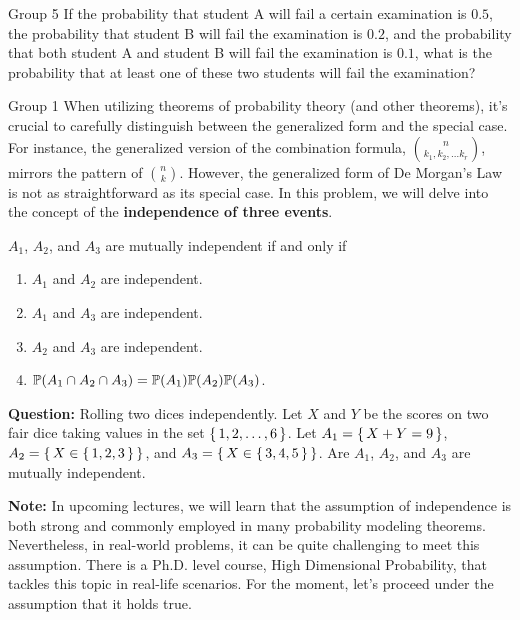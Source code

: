 \documentclass{article}
\begin{document}
\begin{problem}
    {Group 5}
    If the probability that student A will fail a certain examination is $0.5$, the probability that student B will fail the examination is $0.2$, and the probability that both student A and student B will fail the examination is $0.1$, what is the probability that at least one of these two students will fail the examination?
\end{problem}
\begin{problem}
    {Group 1}
    When utilizing theorems of probability theory (and other theorems), it's crucial to carefully distinguish between the generalized form and the special case. For instance, the generalized version of the combination formula, $\binom{n}{k_1,k_2,\ldots k_r}$, mirrors the pattern of $\binom{n}{k}$. However, the generalized form of De Morgan's Law is not as straightforward as its special case. In this problem, we will delve into the concept of the \textbf{independence of three events}.
    \begin{definition}
        $A_1$, $A_2$, and $A_3$ are mutually independent if and only if
        \begin{enumerate}
            \item $A_1$ and $A_2$ are independent.
            \item $A_1$ and $A_3$ are independent.
            \item $A_2$ and $A_3$ are independent.
            \item $\P{A_1\cap A_2\cap A_3}=\P{A_1}\P{A_2}\P{A_3}$.
        \end{enumerate}
    \end{definition}
    \textbf{Question:} Rolling two dices independently. Let $X$ and $Y$ be the scores on two fair dice taking values in the set $\left\lbrace\,1,2,\ldots,6\,\right\rbrace$. Let $A_1 = \left\lbrace\,X+Y=9\,\right\rbrace$, $A_2=\left\lbrace\,X\in \left\lbrace\,1,2,3\,\right\rbrace\,\right\rbrace$, and $A_3=\left\lbrace\,X\in\left\lbrace\,3,4,5\,\right\rbrace\,\right\rbrace$. Are $A_1$, $A_2$, and $A_3$ are mutually independent.

    \textbf{Note:} In upcoming lectures, we will learn that the assumption of independence is both strong and commonly employed in many probability modeling theorems. Nevertheless, in real-world problems, it can be quite challenging to meet this assumption. There is a Ph.D. level course, High Dimensional Probability, that tackles this topic in real-life scenarios. For the moment, let's proceed under the assumption that it holds true.
\end{problem}
\end{document}
